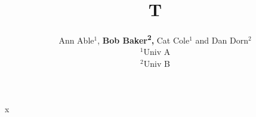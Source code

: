 \documentclass{article}
\title{T}
\author{Ann Able$^1$, {\bf Bob Baker\textsuperscript{2},} Cat Cole$^1$ {\rm and} Dan Dorn$^2$\\ $^1$Univ A\\ $^2$Univ B}
\begin{document}
\maketitle
x
\end{document}
